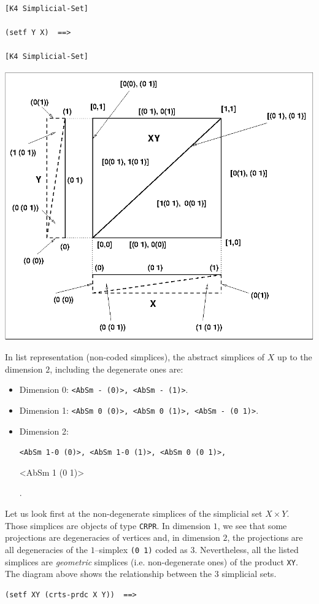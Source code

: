{{\begin{verbatim}
[K4 Simplicial-Set]

(setf Y X)  ==>

[K4 Simplicial-Set]
\end{verbatim}}
%
\vskip 0.40cm
\centerline{\includegraphics{ssquare.eps}}
\vskip 0.40cm
%

In list representation (non-coded simplices), the  abstract simplices of $X$ up to the dimension $2$, 
including the degenerate ones are:
\begin{itemize}
\item {Dimension 0}: {\footnotesize {\tt <AbSm - (0)>, <AbSm - (1)>}}. 
\item {Dimension 1}: {\footnotesize {\tt <AbSm 0 (0)>,  <AbSm 0 (1)>,  <AbSm - (0 1)>}}. 
\item {Dimension 2}: {\footnotesize {\tt <AbSm 1-0 (0)>, <AbSm 1-0 (1)>,  <AbSm 0 (0 1)>, \par
 <AbSm 1 (0 1)>}}.
\end{itemize}

Let us look first at the non-degenerate simplices of the simplicial set $X \times Y$. Those simplices are objects
of type  {\tt CRPR}. In dimension $1$, we see that some projections are
degeneracies of vertices and, in dimension $2$, the projections are all degeneracies of
the $1$--simplex {\tt(0 1)} coded as $3$. Nevertheless, all the listed simplices are {\em geometric} 
simplices (i.e. non-degenerate ones) of the product {\tt XY}. The diagram above shows the relationship between
the $3$ simplicial sets. 
{\footnotesize\begin{verbatim}
(setf XY (crts-prdc X Y))  ==>


\end{verbatim}}}
